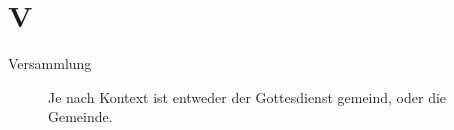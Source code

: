 \section*{V}

\articlesize

\begin{description}
 \item[Versammlung] Je nach Kontext ist entweder der Gottesdienst gemeind, oder die Gemeinde.
 \end{description}

\normalsize
